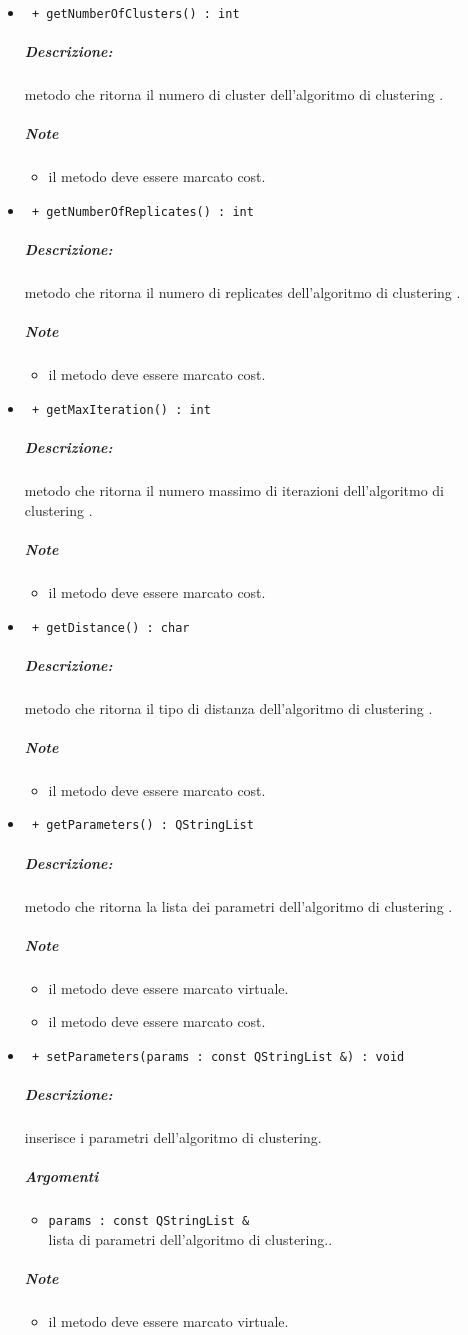 \begin{itemize}
		\item \color{blue}\verb! + getNumberOfClusters() : int!
		\color{black}
		\subparagraph{Descrizione:} metodo che ritorna il numero di cluster dell'algoritmo di clustering\g{} .
		\subparagraph{Note}
			\begin{itemize}
				\item il metodo deve essere marcato cost.
			\end{itemize}
			
			\item \color{blue}\verb! + getNumberOfReplicates() : int!
		\color{black}
		\subparagraph{Descrizione:} metodo che ritorna il numero di replicates dell'algoritmo di clustering\g{} .
		\subparagraph{Note}
			\begin{itemize}
				\item il metodo deve essere marcato cost.
			\end{itemize}
			\item \color{blue}\verb! + getMaxIteration() : int!
		\color{black}
		\subparagraph{Descrizione:} metodo che ritorna il numero massimo di iterazioni dell'algoritmo di clustering\g{} .
		\subparagraph{Note}
			\begin{itemize}
				\item il metodo deve essere marcato cost.
			\end{itemize}
			\item \color{blue}\verb! + getDistance() : char!
		\color{black}
		\subparagraph{Descrizione:} metodo che ritorna il tipo di distanza dell'algoritmo di clustering\g{} .
		\subparagraph{Note}
			\begin{itemize}
				\item il metodo deve essere marcato cost.
			\end{itemize}
			
			
	\item \color{blue}\verb! + getParameters() : QStringList!
		\color{black}
		\subparagraph{Descrizione:} metodo che ritorna la lista dei parametri dell'algoritmo di clustering\g{} .
		\subparagraph{Note}
			\begin{itemize}
				\item il metodo deve essere marcato virtuale.
				\item il metodo deve essere marcato cost.
			\end{itemize}
			
	\item \color{blue}\verb! + setParameters(params : const QStringList &) : void!
		\color{black}
		\subparagraph{Descrizione:} inserisce i parametri dell'algoritmo di clustering\g{}.
		\subparagraph{Argomenti}
			\begin{itemize}
				\item \color{RoyalPurple} \verb!params : const QStringList & ! \\ 
				\color{black} lista di parametri dell'algoritmo di clustering\g{}..		
			\end{itemize}
		\subparagraph{Note}
			\begin{itemize}
				\item il metodo deve essere marcato virtuale.
			\end{itemize}
					

\end{itemize}
